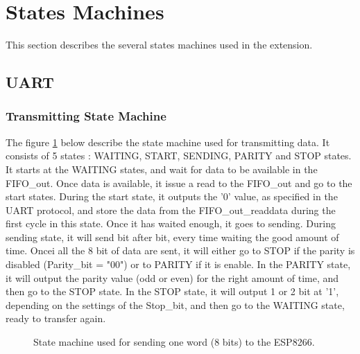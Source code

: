 \documentclass[11pt]{article}
\begin{document}
\section{States Machines}
This section describes the several states machines used in the extension.
\subsection{UART}
\subsubsection{Transmitting State Machine}
The figure \ref{UART_transmit_SM} below describe the state machine used for transmitting data. It consists of 5 states : WAITING, START, SENDING, PARITY and STOP states. It starts at the WAITING states, and wait for data to be available in the FIFO\_out. Once data is available, it issue a read to the FIFO\_out and go to the start states. During the start state, it outputs the '0' value, as specified in the UART protocol, and store the data from the FIFO\_out\_readdata during the first cycle in this state. Once it has waited enough, it goes to sending. During sending state, it will send bit after bit, every time waiting the good amount of time. Oncei all the 8 bit of data are sent, it will either go to STOP if the parity is disabled (Parity\_bit = "00") or to PARITY if it is enable. In the PARITY state, it will output the parity value (odd or even) for the right amount of time, and then go to the STOP state. In the STOP state, it will output 1 or 2 bit at '1', depending on the settings of the Stop\_bit, and then go to the WAITING state, ready to transfer again.
\begin{figure}[H]
        \center
        \caption{State machine used for sending one word (8 bits) to the ESP8266.}
        \label{UART_transmit_SM}
\end{figure}
\end{document}
